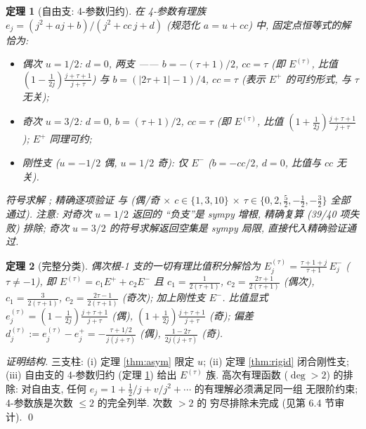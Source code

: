 \documentclass[UTF8]{ctexart}
\newtheorem{theorem}{定理}[section]
\begin{document}
\begin{theorem}[自由支: 4-参数归约]\label{thm:free}
	在 4-参数有理族 $e_j = (j^2 + aj + b)/(j^2 + cc\,j + d)$
	(规范化 $a = u + cc$) 中, 固定点恒等式的解恰为:
	\begin{itemize}
		\item 偶次 $u = 1/2$: $d = 0$, 两支 —— $b = -(\tau+1)/2$,
			$cc = \tau$ (即 $E^{(\tau)}$, 比值 $(1-\frac{1}{2j})
			\frac{j+\tau+1}{j+\tau}$) 与 $b = (|2\tau+1|-1)/4$,
			$cc = \tau$ (表示 $E^+$ 的可约形式, 与 $\tau$ 无关);
		\item 奇次 $u = 3/2$: $d = 0$, $b = (\tau+1)/2$, $cc = \tau$
			(即 $E^{(\tau)}$, 比值 $(1+\frac{1}{2j})
			\frac{j+\tau+1}{j+\tau}$); $E^+$ 同理可约;
		\item 刚性支 ($u = -1/2$ 偶, $u = 1/2$ 奇): 仅 $E^-$
			($b = -cc/2$, $d = 0$, 比值与 $cc$ 无关).
	\end{itemize}
	符号求解 ; 精确逐项验证
	 与
	 (偶/奇 $\times$
	$c \in \{1,3,10\}$ $\times$ $\tau \in \{0, 2, \tfrac52, -\tfrac12, -\tfrac32\}$
	全部通过). 注意:  对奇次 $u = 1/2$ 返回的
	``负支''是 sympy 增根, 精确复算 (39/40 项失败) 排除;
	奇次 $u = 3/2$ 的符号求解返回空集是 sympy 局限, 直接代入精确验证通过.
\end{theorem}

\begin{theorem}[完整分类]\label{thm:full}
	偶次根-1 支的一切\emph{有理比值}积分解恰为
	$E^{(\tau)}_j = \frac{\tau+1+j}{\tau+1}\,E^-_j$
	($\tau \neq -1$), 即 $E^{(\tau)} = c_1 E^+ + c_2 E^-$ 且
	$c_1 = \frac{1}{2(\tau+1)}$, $c_2 = \frac{2\tau+1}{2(\tau+1)}$
	(偶次), $c_1 = \frac{3}{2(\tau+1)}$, $c_2 = \frac{2\tau-1}{2(\tau+1)}$
	(奇次); 加上刚性支 $E^-$. 比值显式
	$e^{(\tau)}_j = (1 - \tfrac{1}{2j})\frac{j+\tau+1}{j+\tau}$ (偶),
	$(1 + \tfrac{1}{2j})\frac{j+\tau+1}{j+\tau}$ (奇);
	偏差 $d^{(\tau)}_j := e^{(\tau)}_j - e^+_j = -\frac{\tau+1/2}{j(j+\tau)}$
	(偶), $\frac{1-2\tau}{2j(j+\tau)}$ (奇).
\end{theorem}

\begin{proof}[证明结构]
	三支柱: (i) 定理 \ref{thm:asym} 限定 $u$; (ii) 定理 \ref{thm:rigid}
	闭合刚性支; (iii) 自由支的 4-参数归约 (定理 \ref{thm:free})
	给出 $E^{(\tau)}$ 族. 高次有理函数 ($\deg > 2$) 的排除: 对自由支,
	任何 $e_j = 1 + \frac12/j + v/j^2 + \cdots$ 的有理解必须满足同一组
	无限阶约束; 4-参数族是次数 $\leq 2$ 的完全列举. 次数 $> 2$ 的
	穷尽排除未完成 (见第 6.4 节审计). \qed
\end{proof}
\end{document}
